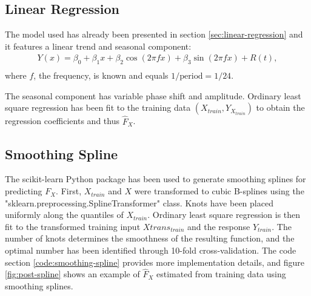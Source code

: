 \subsection{Linear Regression}

The model used has already been presented in section \ref{sec:linear-regression} and
it features a linear trend and seasonal component:
\begin{gather*}
Y(x) = \beta_0 + \beta_1 x + \beta_2 \cos(2 \pi f x) + \beta_3 \sin(2 \pi f x) + R(t), \\
\end{gather*}
where $f$, the frequency, is known and equals $1/\text{period} = 1/24$.

The seasonal component has variable phase shift and amplitude.
Ordinary least square regression has been fit to the training data
$(X_{train}, Y_{X_{train}})$ to obtain the regression coefficients and thus
$\hat{F}_X$.
%

\subsection{Smoothing Spline}
The scikit-learn Python package has been used to
generate smoothing splines for predicting $F_X$.
First, $X_{train}$ and $X$ were transformed to cubic B-splines using the \\
"sklearn.preprocessing.SplineTransformer" class.
Knots have been placed uniformly along the quantiles of $X_{train}$.
Ordinary least square regression is then fit to the transformed training
input $Xtrans_{train}$ and the response $Y_{train}$.
The number of knots determines the smoothness of the resulting function,
and the optimal number has been identified through 10-fold
cross-validation.
%
The code section \ref{code:smoothing-spline} provides more implementation details,
and figure \ref{fig:post-spline} shows an example of $\hat{F}_X$ estimated
from training data using smoothing splines.

